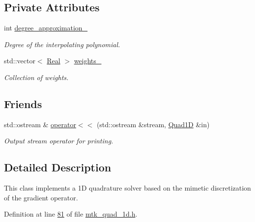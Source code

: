 \subsection*{Private Attributes}
\begin{DoxyCompactItemize}
\item 
int \hyperlink{classmtk_1_1Quad1D_aaff281c19f70faeb07f610fcffb300c5}{degree\-\_\-approximation\-\_\-}
\begin{DoxyCompactList}\small\item\em Degree of the interpolating polynomial. \end{DoxyCompactList}\item 
std\-::vector$<$ \hyperlink{group__c01-roots_gac080bbbf5cbb5502c9f00405f894857d}{Real} $>$ \hyperlink{classmtk_1_1Quad1D_abce6b19c2e089bc0691ef7623ec6d994}{weights\-\_\-}
\begin{DoxyCompactList}\small\item\em Collection of weights. \end{DoxyCompactList}\end{DoxyCompactItemize}
\subsection*{Friends}
\begin{DoxyCompactItemize}
\item 
std\-::ostream \& \hyperlink{classmtk_1_1Quad1D_af1194665f127e323852f778c8c0d4f95}{operator$<$$<$} (std\-::ostream \&stream, \hyperlink{classmtk_1_1Quad1D}{Quad1\-D} \&in)
\begin{DoxyCompactList}\small\item\em Output stream operator for printing. \end{DoxyCompactList}\end{DoxyCompactItemize}


\subsection{Detailed Description}
This class implements a 1\-D quadrature solver based on the mimetic discretization of the gradient operator. 

Definition at line \hyperlink{mtk__quad__1d_8h_source_l00081}{81} of file \hyperlink{mtk__quad__1d_8h_source}{mtk\-\_\-quad\-\_\-1d.\-h}.



